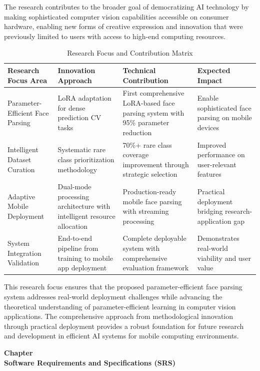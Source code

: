 \documentclass[12pt,a4paper]{report}
\begin{document}
The research contributes to the broader goal of democratizing AI technology by making sophisticated computer vision capabilities accessible on consumer hardware, enabling new forms of creative expression and innovation that were previously limited to users with access to high-end computing resources.

\begin{table}[H]
\centering
\caption{Research Focus and Contribution Matrix}
\label{tab:research_focus_contribution}
\begin{tabular}{|p{4cm}|p{3cm}|p{3cm}|p{4cm}|}
\hline
\textbf{Research Focus Area} & \textbf{Innovation Approach} & \textbf{Technical Contribution} & \textbf{Expected Impact} \\
\hline
Parameter-Efficient Face Parsing & LoRA adaptation for dense prediction CV tasks & First comprehensive LoRA-based face parsing system with 95\% parameter reduction & Enable sophisticated face parsing on mobile devices \\
\hline
Intelligent Dataset Curation & Systematic rare class prioritization methodology & 70\%+ rare class coverage improvement through strategic selection & Improved performance on user-relevant features \\
\hline
Adaptive Mobile Deployment & Dual-mode processing architecture with intelligent resource allocation & Production-ready mobile face parsing with streaming processing & Practical deployment bridging research-application gap \\
\hline
System Integration Validation & End-to-end pipeline from training to mobile app deployment & Complete deployable system with comprehensive evaluation framework & Demonstrates real-world viability and user value \\
\hline
\end{tabular}
\end{table}

This research focus ensures that the proposed parameter-efficient face parsing system addresses real-world deployment challenges while advancing the theoretical understanding of parameter-efficient learning in computer vision applications. The comprehensive approach from methodological innovation through practical deployment provides a robust foundation for future research and development in efficient AI systems for mobile computing environments.
\newpage
\clearpage
\thispagestyle{empty}  %
\vspace*{\fill}
\begin{center}
{\Huge\bfseries Chapter \thechapter}\\[30pt]
{\Huge\bfseries Software Requirements and Specifications (SRS)}
\end{center}
\vspace*{\fill}
\label{ch:srs}
\clearpage
\newpage
\end{document}
